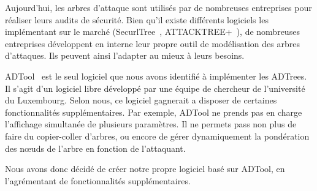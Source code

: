         Aujourd'hui, les arbres d'attaque sont utilisés par de nombreuses entreprises pour réaliser leurs audits de sécurité. Bien qu'il existe différents logiciels les implémentant sur le marché (SecurlTree~\cite{SecurlTree}, ATTACKTREE+~\cite{ATTACKTREE+}), de nombreuses entreprises développent en interne leur propre outil de modélisation des arbres d'attaques. Ils peuvent ainsi l'adapter au mieux à leurs besoins. 

        ADTool~\cite{ADTool} est le seul logiciel que nous avons identifié à implémenter les ADTrees. Il s'agit d'un logiciel libre développé par une équipe de chercheur de l'université du Luxembourg. Selon nous, ce logiciel gagnerait a disposer de certaines fonctionnalités supplémentaires. Par exemple, ADTool ne prends pas en charge l'affichage simultanée de plusieurs paramètres. Il ne permets pass non plus de faire du copier-coller d'arbres, ou encore de gérer dynamiquement la pondération des nœuds de l’arbre en fonction de l'attaquant. 

        Nous avons donc décidé de créer notre propre logiciel basé sur ADTool, en l'agrémentant de fonctionnalités supplémentaires.




